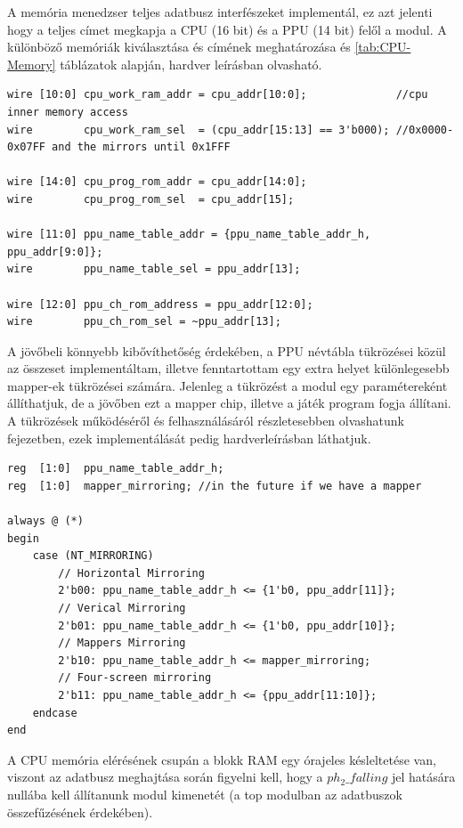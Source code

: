 A memória menedzser teljes adatbusz interfészeket implementál, ez azt jelenti hogy a teljes címet megkapja a CPU (16 bit) és a PPU (14 bit) felől a modul. A különböző memóriák kiválasztása és címének meghatározása  és \ref{tab:CPU-Memory} táblázatok alapján,  hardver leírásban olvasható.

\begin{lstlisting}[caption={A memória menedzserben található memória területek címzése}, label={code:memory-addresing}, style=prettyverilog]
wire [10:0]	cpu_work_ram_addr = cpu_addr[10:0];			 	 //cpu inner memory access
wire		cpu_work_ram_sel  = (cpu_addr[15:13] == 3'b000); //0x0000-0x07FF and the mirrors until 0x1FFF

wire [14:0]	cpu_prog_rom_addr = cpu_addr[14:0];			 
wire		cpu_prog_rom_sel  = cpu_addr[15]; 

wire [11:0]	ppu_name_table_addr = {ppu_name_table_addr_h, ppu_addr[9:0]};
wire		ppu_name_table_sel = ppu_addr[13];

wire [12:0] ppu_ch_rom_address = ppu_addr[12:0];
wire		ppu_ch_rom_sel = ~ppu_addr[13];\end{lstlisting}

A jövőbeli könnyebb kibővíthetőség érdekében, a PPU névtábla tükrözései közül az összeset implementáltam, illetve fenntartottam egy extra helyet különlegesebb mapper-ek tükrözései számára. Jelenleg a tükrözést a modul egy paramétereként állíthatjuk, de a jövőben ezt a mapper chip, illetve a játék program fogja állítani. A tükrözések működéséről és felhasználásáról részletesebben olvashatunk  fejezetben, ezek implementálását pedig  hardverleírásban láthatjuk. 

\begin{lstlisting}[caption={A PPU görgetéshez használt névtábla tükrözés}, label={code:nt-address-mirroring}, style=prettyverilog]
reg  [1:0] 	ppu_name_table_addr_h;
reg	 [1:0]	mapper_mirroring; //in the future if we have a mapper

always @ (*)
begin
	case (NT_MIRRORING)
		// Horizontal Mirroring
		2'b00: ppu_name_table_addr_h <= {1'b0, ppu_addr[11]};
		// Verical Mirroring
		2'b01: ppu_name_table_addr_h <= {1'b0, ppu_addr[10]};
		// Mappers Mirroring
		2'b10: ppu_name_table_addr_h <= mapper_mirroring;
		// Four-screen mirroring 
		2'b11: ppu_name_table_addr_h <= {ppu_addr[11:10]};
	endcase
end\end{lstlisting}

A CPU memória elérésének csupán a blokk RAM egy órajeles késleltetése van, viszont az adatbusz meghajtása során figyelni kell, hogy a $ph_2\_falling$ jel hatására nullába kell állítanunk modul kimenetét (a top modulban az adatbuszok összefűzésének érdekében).

